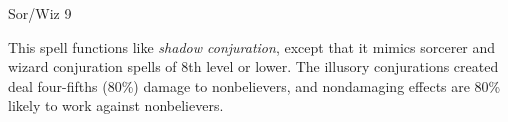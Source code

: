 
\begin{description*}
\item[Level:] Sor/Wiz 9
\end{description*}

This spell functions like \textit{shadow conjuration}, except that it mimics sorcerer
and wizard conjuration spells of 8th level or lower. The illusory conjurations
created deal four-fifths (80\%) damage to nonbelievers, and nondamaging effects
are 80\% likely to work against nonbelievers.